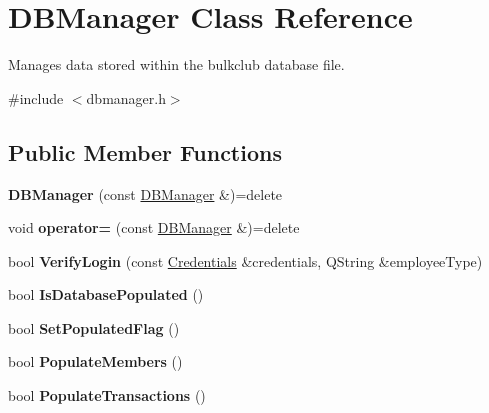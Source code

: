 \hypertarget{class_d_b_manager}{}\section{D\+B\+Manager Class Reference}
\label{class_d_b_manager}


Manages data stored within the bulkclub database file.  




{\ttfamily \#include $<$dbmanager.\+h$>$}

\subsection*{Public Member Functions}
\begin{DoxyCompactItemize}
\item 
\mbox{\label{class_d_b_manager_a14fa55f5fc5808730566dbc7724dbc99}} 
{\bfseries D\+B\+Manager} (const \mbox{\hyperlink{class_d_b_manager}{D\+B\+Manager}} \&)=delete
\item 
\mbox{\label{class_d_b_manager_adae25ff25c9a6d385aad1f77c6b5ec95}} 
void {\bfseries operator=} (const \mbox{\hyperlink{class_d_b_manager}{D\+B\+Manager}} \&)=delete
\item 
\mbox{\label{class_d_b_manager_ac9fc43d8d42f0de24c2daae2135195aa}} 
bool {\bfseries Verify\+Login} (const \mbox{\hyperlink{class_credentials}{Credentials}} \&credentials, Q\+String \&employee\+Type)
\item 
\mbox{\label{class_d_b_manager_a40cf58eb81b82abebe7df72edddab87e}} 
bool {\bfseries Is\+Database\+Populated} ()
\item 
\mbox{\label{class_d_b_manager_a7f80a2ac0360dd2ba6fc18431dd9ef6c}} 
bool {\bfseries Set\+Populated\+Flag} ()
\item 
\mbox{\label{class_d_b_manager_aa580524cb93affde099ac37e9ee468d7}} 
bool {\bfseries Populate\+Members} ()
\item 
\mbox{\label{class_d_b_manager_a7e023e13095712a08c2b7a47656d8d7e}} 
bool {\bfseries Populate\+Transactions} ()
\item 

\end{DoxyCompactItemize}
